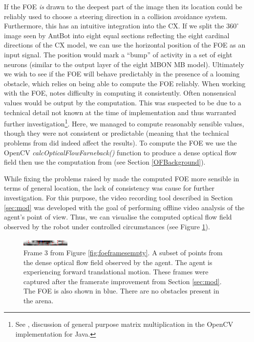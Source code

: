 \documentclass[a4paper,11pt,twoside,openright]{article}
\begin{document}
If the FOE \textit{is} drawn to the deepest part of the image then its
location could be reliably used to choose a steering direction in a
collision avoidance system. Furthermore, this has an intuitive
integration into the CX. If we split the $360^{\circ}$ image seen by
AntBot into eight equal sections reflecting the eight cardinal
directions of the CX model, we can use the horizontal position of the
FOE as an input signal. The position would mark a ``bump'' of activity
in a set of eight neurons (similar to the output layer of the eight
MBON MB model). Ultimately we wish to see if the FOE will behave
predictably in the presence of a looming obstacle, which relies on
being able to compute the FOE reliably.  When working with the FOE,
\cite{Mitchell2018} notes difficulty in computing it
consistently. Often nonsensical values would be output by the
computation. This was suspected to be due to a technical detail not
known at the time of implementation and thus warranted further
investigation\footnote{See \cite{Mitchell2018}, discussion of general
  purpose matrix multiplication in the OpenCV implementation for
  Java.}. Here, we managed to compute reasonably sensible values,
though they were not consistent or predictable (meaning that the
technical problems from \cite{Mitchell2018} did indeed affect the
results). To compute the FOE we use the OpenCV
\textit{calcOpticalFlowFarneback()} function to produce a dense
optical flow field then use the computation from \cite{ODonovan2005}
(see Section \ref{OFBackground}).
\newline
\par

While fixing the problems raised by \cite{Mitchell2018} made the computed FOE
more sensible in terms of general location, the lack of consistency was cause
for further investigation. For this purpose, the video recording tool described
in Section \ref{sec:mod} was developed with the goal of performing offline
video analysis of the agent's point of view. Thus, we can visualise the
computed optical flow field observed by the robot under controlled circumstances
(see Figure \ref{fig:flowfield}).\newline\par

\begin{figure}[h!]
  \centering
  \includegraphics[width=\textwidth]{frame_00066}
  \caption{\label{fig:flowfield} Frame 3 from Figure
    \ref{fig:foeframesempty}. A subset of points from the dense
    optical flow field observed by the agent.  The agent is
    experiencing forward translational motion. These frames were
    captured after the framerate improvement from Section
    \ref{sec:mod}. The FOE is also shown in blue. There are no
    obstacles present in the arena.  }
\end{figure}
\end{document}

